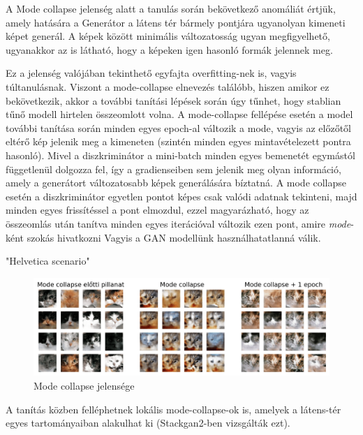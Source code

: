 

A Mode collapse jelenség alatt a tanulás során bekövetkező anomáliát értjük, amely hatására a Generátor a látens tér bármely pontjára ugyanolyan kimeneti képet generál. A képek között minimális változatosság ugyan megfigyelhető, ugyanakkor az is látható, hogy a képeken igen hasonló formák jelennek meg.

Ez a jelenség valójában tekinthető egyfajta overfitting-nek is, vagyis túltanulásnak. Viszont a mode-collapse elnevezés találóbb, hiszen amikor ez bekövetkezik, akkor a további tanítási lépések során úgy tűnhet, hogy stablian tűnő modell hirtelen összeomlott volna.
A mode-collapse fellépése esetén a model további tanítása során minden egyes epoch-al változik a mode, vagyis az előzőtől eltérő kép jelenik meg a kimeneten (szintén minden egyes mintavételezett pontra hasonló). Mivel a diszkriminátor a mini-batch minden egyes bemenetét egymástól függetlenül dolgozza fel, így a gradienseiben sem jelenik meg olyan információ, amely a generátort változatosabb képek generálására bíztatná. A mode collapse esetén a diszkriminátor egyetlen pontot képes csak valódi adatnak tekinteni, majd minden egyes frissítéssel a pont elmozdul, ezzel magyarázható, hogy az összeomlás után tanítva minden egyes iterációval változik ezen pont, amire \textit{mode}-ként szokás hivatkozni \cite{salimans2016improved} Vagyis a GAN modellünk használhatatlanná válik.

"Helvetica scenario"

\begin{figure}[h]
	\centering
	\includegraphics[width=15cm]{images/mode-collapse.png}
	\caption{Mode collapse jelensége}
	\label{fig:mode-collapse}
\end{figure}

A tanítás közben felléphetnek lokális mode-collapse-ok is, amelyek a látens-tér egyes tartományaiban alakulhat ki (Stackgan2-ben vizsgálták ezt).

